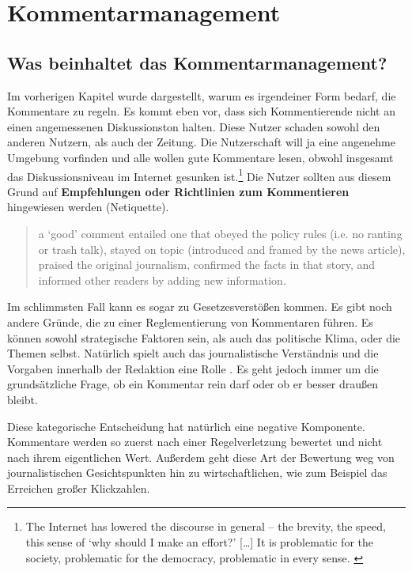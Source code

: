 \chapter{Kommentarmanagement}

\section{Was beinhaltet das Kommentarmanagement?}
Im vorherigen Kapitel wurde dargestellt, warum es irgendeiner Form bedarf, die
Kommentare zu regeln. Es kommt eben vor, dass sich Kommentierende nicht an einen
angemessenen Diskussionston halten. Diese Nutzer schaden sowohl den anderen
Nutzern, als auch der Zeitung. Die Nutzerschaft will ja eine angenehme Umgebung
vorfinden \autocite[S.~217]{meyer-carey} und alle wollen \glqq gute\grqq{}
Kommentare lesen, obwohl insgesamt das Diskussionsniveau im Internet gesunken
ist.\footnote{\glqq The Internet has lowered the discourse in general – the brevity,
the speed, this sense of ‘why should I make an effort?' [\ldots] It is
problematic for the society, problematic for the democracy, problematic in every
sense.\grqq\- \autocite[S.~130]{singer}} Die Nutzer sollten aus diesem Grund auf
{\bfseries Empfehlungen oder Richtlinien zum Kommentieren} hingewiesen werden
(\glqq Netiquette\grqq).


\begin{quote}
\glqq [\ldots] a `good' comment entailed one that obeyed the policy rules (i.e. no
ranting or trash talk), stayed on topic (introduced and framed by the news
article), praised the original journalism, confirmed the facts in that story,
and informed other readers by adding new information.\grqq\- 
\autocite[S.~134]{robinson}
\end{quote}

Im schlimmsten Fall kann es sogar zu Gesetzesverstößen kommen. Es gibt noch
andere Gründe, die zu einer Reglementierung von Kommentaren führen. Es können
sowohl strategische Faktoren sein, als auch das politische Klima, oder die
Themen selbst. Natürlich spielt auch das journalistische Verständnis und die
Vorgaben innerhalb der Redaktion eine Rolle \autocite[S.~106f]{reich}. Es geht
jedoch immer um die grundsätzliche Frage, ob ein Kommentar \glqq rein\grqq{}
darf oder ob er besser \glqq draußen\grqq{}  bleibt.

Diese kategorische Entscheidung hat natürlich eine negative Komponente.
Kommentare werden so zuerst nach einer Regelverletzung bewertet und nicht nach
ihrem eigentlichen Wert. Außerdem geht diese Art der Bewertung weg von
journalistischen Gesichtspunkten hin zu wirtschaftlichen, wie zum Beispiel das
Erreichen großer Klickzahlen.

